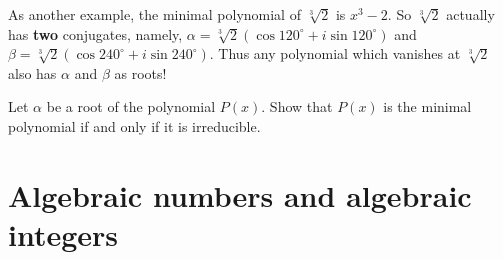 As another example, the minimal polynomial of $\sqrt[3]{2}$ is $x^3-2$. So $\sqrt[3]{2}$ actually has \textbf{two} conjugates, namely, $\alpha = \sqrt[3]{2} \left( \cos 120^\circ + i \sin 120^\circ \right)$ and $\beta = \sqrt[3]{2} \left( \cos 240^\circ + i \sin 240^\circ \right)$. Thus any polynomial which vanishes at $\sqrt[3]{2}$ also has $\alpha$ and $\beta$ as roots!

\begin{ques}
	Let $\alpha$ be a root of the polynomial $P(x)$.
	Show that $P(x)$ is the minimal polynomial
	if and only if it is irreducible.
\end{ques}

\section{Algebraic numbers and algebraic integers}


